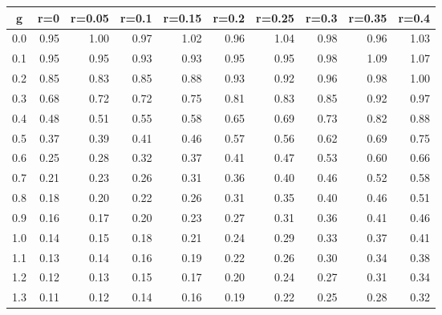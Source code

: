 %
\begin{table}[!tbp]
 \begin{center}
 \begin{tabular}{rrrrrrrrrr}\hline\hline
\multicolumn{1}{c}{g}&\multicolumn{1}{c}{r=0}&\multicolumn{1}{c}{r=0.05}&\multicolumn{1}{c}{r=0.1}&\multicolumn{1}{c}{r=0.15}&\multicolumn{1}{c}{r=0.2}&\multicolumn{1}{c}{r=0.25}&\multicolumn{1}{c}{r=0.3}&\multicolumn{1}{c}{r=0.35}&\multicolumn{1}{c}{r=0.4}\tabularnewline
\hline
0.0&0.95&1.00&0.97&1.02&0.96&1.04&0.98&0.96&1.03\tabularnewline
0.1&0.95&0.95&0.93&0.93&0.95&0.95&0.98&1.09&1.07\tabularnewline
0.2&0.85&0.83&0.85&0.88&0.93&0.92&0.96&0.98&1.00\tabularnewline
0.3&0.68&0.72&0.72&0.75&0.81&0.83&0.85&0.92&0.97\tabularnewline
0.4&0.48&0.51&0.55&0.58&0.65&0.69&0.73&0.82&0.88\tabularnewline
0.5&0.37&0.39&0.41&0.46&0.57&0.56&0.62&0.69&0.75\tabularnewline
0.6&0.25&0.28&0.32&0.37&0.41&0.47&0.53&0.60&0.66\tabularnewline
0.7&0.21&0.23&0.26&0.31&0.36&0.40&0.46&0.52&0.58\tabularnewline
0.8&0.18&0.20&0.22&0.26&0.31&0.35&0.40&0.46&0.51\tabularnewline
0.9&0.16&0.17&0.20&0.23&0.27&0.31&0.36&0.41&0.46\tabularnewline
1.0&0.14&0.15&0.18&0.21&0.24&0.29&0.33&0.37&0.41\tabularnewline
1.1&0.13&0.14&0.16&0.19&0.22&0.26&0.30&0.34&0.38\tabularnewline
1.2&0.12&0.13&0.15&0.17&0.20&0.24&0.27&0.31&0.34\tabularnewline
1.3&0.11&0.12&0.14&0.16&0.19&0.22&0.25&0.28&0.32\tabularnewline
\hline
\end{tabular}

\end{center}

\end{table}


